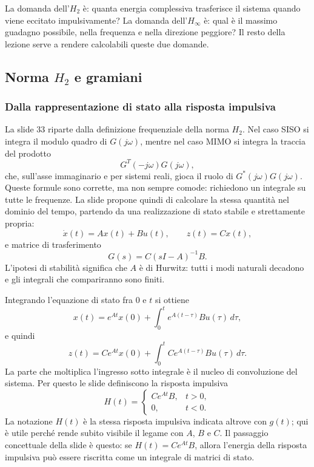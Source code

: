 \documentclass[11pt,a4paper]{article}
\begin{document}
\begin{keybox}
La domanda dell'$H_2$ \`e: quanta energia complessiva trasferisce il sistema quando viene eccitato impulsivamente? La domanda dell'$H_\infty$ \`e: qual \`e il massimo guadagno possibile, nella frequenza e nella direzione peggiore? Il resto della lezione serve a rendere calcolabili queste due domande.
\end{keybox}

\subsection{Norma \texorpdfstring{$H_2$}{H2} e gramiani}

\subsubsection{Dalla rappresentazione di stato alla risposta impulsiva}

La slide 33 riparte dalla definizione frequenziale della norma $H_2$. Nel caso SISO si integra il modulo quadro di $G(j\omega)$, mentre nel caso MIMO si integra la traccia del prodotto
$$
G^T(-j\omega)G(j\omega),
$$
che, sull'asse immaginario e per sistemi reali, gioca il ruolo di $G^*(j\omega)G(j\omega)$. Queste formule sono corrette, ma non sempre comode: richiedono un integrale su tutte le frequenze. La slide propone quindi di calcolare la stessa quantit\`a nel dominio del tempo, partendo da una realizzazione di stato stabile e strettamente propria:
$$
\dot x(t)=Ax(t)+Bu(t),
\qquad
z(t)=Cx(t),
$$
e matrice di trasferimento
$$
G(s)=C(sI-A)^{-1}B.
$$
L'ipotesi di stabilit\`a significa che $A$ \`e di Hurwitz: tutti i modi naturali decadono e gli integrali che compariranno sono finiti.

Integrando l'equazione di stato fra $0$ e $t$ si ottiene
$$
x(t)=e^{At}x(0)+\int_0^t e^{A(t-\tau)}Bu(\tau)\,d\tau,
$$
e quindi
$$
z(t)=Ce^{At}x(0)+\int_0^t Ce^{A(t-\tau)}Bu(\tau)\,d\tau.
$$
La parte che moltiplica l'ingresso sotto integrale \`e il nucleo di convoluzione del sistema. Per questo le slide definiscono la risposta impulsiva
$$
H(t)=
\begin{cases}
Ce^{At}B, & t>0,\\
0, & t<0.
\end{cases}
$$
La notazione $H(t)$ \`e la stessa risposta impulsiva indicata altrove con $g(t)$; qui \`e utile perch\'e rende subito visibile il legame con $A$, $B$ e $C$. Il passaggio concettuale della slide \`e questo: se $H(t)=Ce^{At}B$, allora l'energia della risposta impulsiva pu\`o essere riscritta come un integrale di matrici di stato.
\end{document}
